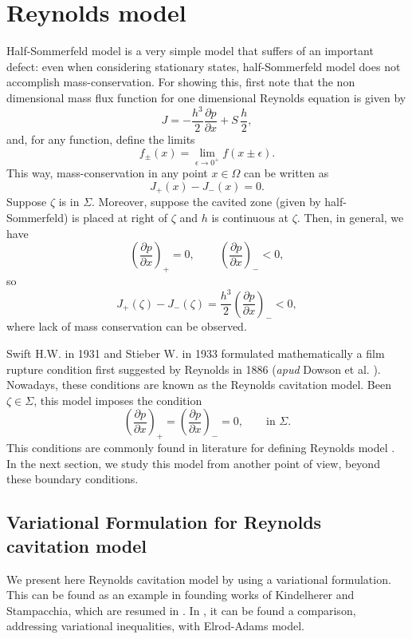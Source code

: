 \section{Reynolds model}\label{sec:reynolds_model}
Half-Sommerfeld model is a very simple model that suffers of an important defect: even when considering stationary states, half-Sommerfeld model does not accomplish mass-conservation. For showing this, first note that the non dimensional mass flux function for one dimensional Reynolds equation is given by
\begin{equation}
J=-\frac{h^3}{2}\frac{\partial p}{\partial x	}+S\,\frac{h}{2},\label{eq:flux_J_reynolds}
\end{equation}
and, for any function, define the limits
$$f_\pm(x)=\underset{\epsilon \rightarrow 0^+}{\lim}f(x\pm\epsilon).$$
This way, mass-conservation in any point $x\in\Omega$ can be written as
$$J_+(x)-J_-(x)=0.$$
Suppose $\zeta$ is in $\Sigma$. Moreover, suppose the cavited zone (given by half-Sommerfeld) is placed at right of $\zeta$ and $h$ is continuous at $\zeta$. Then, in general, we have 
$$\left(\frac{\partial p}{\partial x}\right)_+=0,\qquad \,\left(\frac{\partial p}{\partial x}\right)_-<0,$$
so 
$$J_+(\zeta)-J_-(\zeta)=\frac{h^3}{2}\left(\frac{\partial p}{\partial x	}\right)_-<0,$$
where lack of mass conservation can be observed.

Swift H.W. in 1931 and Stieber W. in 1933 formulated mathematically a film rupture condition first suggested by Reynolds in 1886 (\emph{apud} Dowson et al. \cite{dowson1979}). Nowadays, these conditions are known as the Reynolds cavitation model. Been $\zeta\in \Sigma$, this model imposes the condition
\begin{equation}
\left(\frac{\partial p}{\partial x}\right)_+=\left(\frac{\partial p}{\partial x}\right)_-=0,\qquad \text{in }\Sigma.\label{eq:reynolds_cond_1d}
\end{equation}
This conditions are commonly found in literature for defining Reynolds model \cite{cameron1971,dowson1979,braun2010}. In the next section, we study this model from another point of view, beyond these boundary conditions.
\subsection{Variational Formulation for Reynolds cavitation model}
\label{sec:weak_form_reynolds_model}
We present here Reynolds cavitation model by using a variational formulation. This can be found as an example in founding works of Kindelherer and Stampacchia, which are resumed in \cite{kinderlehrer1980}. In \cite{chambat1986}, it can be found a comparison, addressing variational inequalities, with Elrod-Adams model.

